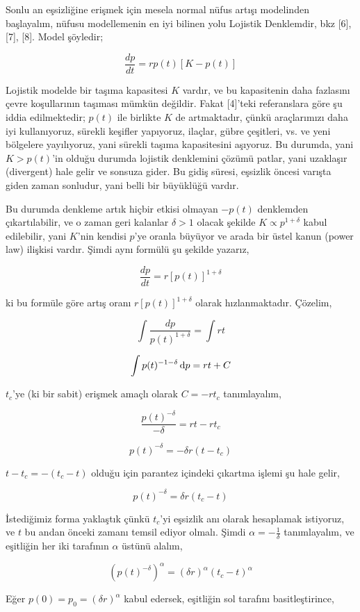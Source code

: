 \documentclass[12pt,fleqn]{article}\usepackage{../../common}
\begin{document}
Sonlu an eşsizliğine erişmek için mesela normal nüfus artışı modelinden
başlayalım, nüfusu modellemenin en iyi bilinen yolu Lojistik Denklemdir,
bkz [6], [7], [8]. Model şöyledir;

$$ \frac{dp}{dt} = rp(t) [ K - p(t) ] $$

Lojistik modelde bir taşıma kapasitesi $K$ vardır, ve bu kapasitenin daha
fazlasını çevre koşullarının taşıması mümkün değildir. Fakat [4]'teki
referanslara göre şu iddia edilmektedir; $p(t)$ ile birlikte $K$ de
artmaktadır, çünkü araçlarımızı daha iyi kullanıyoruz, sürekli keşifler
yapıyoruz, ilaçlar, gübre çeşitleri, vs. ve yeni bölgelere yayılıyoruz,
yani sürekli taşıma kapasitesini aşıyoruz. Bu durumda, yani $K > p(t)$'in
olduğu durumda lojistik denklemini çözümü patlar, yani uzaklaşır
(divergent) hale gelir ve sonsuza gider. Bu gidiş süresi, eşsizlik öncesi
varışta giden zaman sonludur, yani belli bir büyüklüğü vardır.

Bu durumda denkleme artık hiçbir etkisi olmayan $-p(t)$ denklemden
çıkartılabilir, ve o zaman geri kalanlar $\delta > 1$ olacak şekilde $K
\propto p^{1+\delta}$ kabul edilebilir, yani $K$'nin kendisi $p$'ye oranla 
büyüyor ve arada bir üstel kanun (power law) ilişkisi vardır. Şimdi aynı 
formülü şu şekilde yazarız, 

$$ \frac{dp}{dt} = r [p(t)]^{1+\delta} $$

ki bu formüle göre artış oranı $r [p(t)]^{1+\delta}$ olarak
hızlanmaktadır. Çözelim, 

$$ \int \frac{dp}{p(t)^{1+\delta}} = \int rt$$

$$ \int p(t)^{-1-\delta} \,\mathrm{d} p = rt + C $$

$t_c$'ye (ki bir sabit) erişmek amaçlı olarak $C = -rt_c$ tanımlayalım,

$$ \frac{p(t)^{-\delta}}{-\delta} = rt - rt_c $$

$$ p(t)^{-\delta}= -\delta r(t - t_c) $$

$t-t_c = -(t_c-t)$ olduğu için parantez içindeki çıkartma işlemi şu hale
gelir, 

$$ p(t)^{-\delta}= \delta r(t_c - t) $$

İstediğimiz forma yaklaştık çünkü $t_c$'yi eşsizlik anı olarak hesaplamak
istiyoruz, ve $t$ bu andan önceki zamanı temsil ediyor olmalı. Şimdi 
$\alpha = -\frac{1}{\delta}$ tanımlayalım, ve eşitliğin her iki tarafının
$\alpha$ üstünü alalım,

$$ (p(t)^{-\delta})^\alpha= (\delta r )^\alpha (t_c - t)^\alpha $$

Eğer $p(0) = p_0 = (\delta r )^\alpha$ kabul edersek, eşitliğin sol
tarafını basitleştirince,
\end{document}
